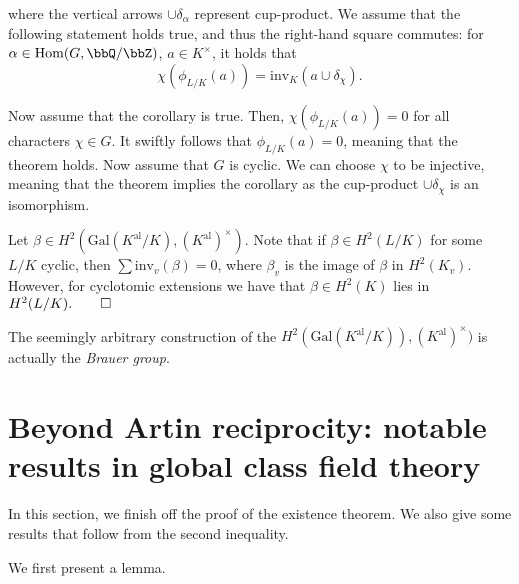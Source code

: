 \documentclass[a4paper, 12pt,oneside,openany]{book}
\begin{document}
where the vertical arrows $\cup \delta_\alpha$ represent cup-product. We assume that the following statement holds true, and thus the right-hand square commutes: for $\alpha \in \text{Hom}(G, \bbQ/\bbZ)$, $a \in K^\times$, it holds that $$\chi(\phi_{L/K}(a)) = \text{inv}_K(a \cup \delta_\chi).$$

Now assume that the corollary is true. Then, $\chi(\phi_{L/K}(a)) = 0$ for all characters $\chi \in G$. It swiftly follows that $\phi_{L/K}(a)=0$, meaning that the theorem holds. Now assume that $G$ is cyclic. We can choose $\chi$ to be injective, meaning that the theorem implies the corollary as the cup-product $\cup \delta_\chi$ is an isomorphism.


Let $\beta \in H^2(\text{Gal}(K^{\text{al}}/K), (K^{\text{al}})^\times).$ Note that if $\beta \in H^2(L/K)$ for some $L/K$ cyclic, then $\sum \text{inv}_v(\beta)=0$, where $\beta_v$ is the image of $\beta$ in $H^2(K_v)$. However, for cyclotomic extensions we have that $\beta \in H^2(K)$ lies in $H^2(L/K). \qed$

The seemingly arbitrary construction of the $H^2(\text{Gal}(K^{\text{al}}/K)), (K^{\text{al}})^\times)$ is actually the \emph{Brauer group}. 

\section{Beyond Artin reciprocity: notable results in global class field theory}

In this section, we finish off the proof of the existence theorem. We also give some results that follow from the second inequality.


 We first present a lemma.

\end{document}
